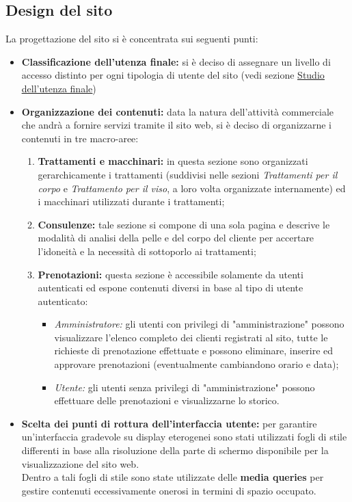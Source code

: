 \documentclass{article}
\begin{document}
\subsection{Design del sito}
La progettazione del sito si è concentrata sui seguenti punti:
	\begin{itemize}
		\item \textbf{Classificazione dell'utenza finale:} si è deciso di assegnare un livello di accesso distinto per ogni tipologia di utente del sito (vedi sezione \hyperref[analisi:utenza]{\underline{Studio dell'utenza finale}}) 
		\item \textbf{Organizzazione dei contenuti:} data la natura dell'attività commerciale che andrà a fornire servizi tramite il sito web, si è deciso di organizzarne i contenuti in tre macro-aree:
			\begin{enumerate}
				\item \textbf{Trattamenti e macchinari:} in questa sezione sono organizzati gerarchicamente i trattamenti (suddivisi nelle sezioni \textit{Trattamenti per il corpo} e \textit{Trattamento per il viso}, a loro volta organizzate internamente) ed i macchinari utilizzati durante i trattamenti;
				\item \textbf{Consulenze:} tale sezione si compone di una sola pagina e descrive le modalità di analisi della pelle e del corpo del cliente per accertare l'idoneità e la necessità di sottoporlo ai trattamenti;
				\item \textbf{Prenotazioni:} questa sezione è accessibile solamente da utenti autenticati ed espone contenuti diversi in base al tipo di utente autenticato:
					\begin{itemize}
						\item \textit{Amministratore:} gli utenti con privilegi di "amministrazione" possono visualizzare l'elenco completo dei clienti registrati al sito, tutte le richieste di prenotazione effettuate e possono eliminare, inserire ed approvare prenotazioni (eventualmente cambiandono orario e data);
						\item \textit{Utente:} gli utenti senza privilegi di "amministrazione" possono effettuare delle prenotazioni e visualizzarne lo storico.  
					\end{itemize}
			\end{enumerate} 
		\item \textbf{Scelta dei punti di rottura dell'interfaccia utente:} per garantire un'interfaccia gradevole su display eterogenei sono stati utilizzati fogli di stile differenti in base alla risoluzione della parte di schermo disponibile per la visualizzazione del sito web. \\
		 Dentro a tali fogli di stile sono state utilizzate delle \textbf{media queries} per gestire contenuti eccessivamente onerosi in termini di spazio occupato.
	\end{itemize}
\end{document}
